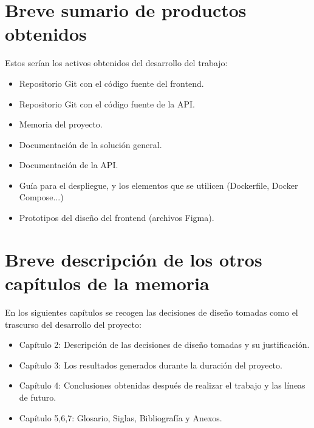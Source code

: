\section{Breve sumario de productos obtenidos}
Estos serían los activos obtenidos del desarrollo del trabajo:
\begin{itemize}
	\item Repositorio Git con el código fuente del frontend.
	\item Repositorio Git con el código fuente de la API.
	\item Memoria del proyecto.
	\item Documentación de la solución general.
	\item Documentación de la API.
	\item Guía para el despliegue, y los elementos que se utilicen (Dockerfile, Docker Compose...)
	\item Prototipos del diseño del frontend (archivos Figma).
\end{itemize}

\section{Breve descripción de los otros capítulos de la memoria}
En los siguientes capítulos se recogen las decisiones de diseño tomadas como el trascurso del desarrollo del proyecto:
\begin{itemize}
	\item Capítulo 2: Descripción de las decisiones de diseño tomadas y su justificación.
	\item Capítulo 3: Los resultados generados durante la duración del proyecto.
	\item Capítulo 4: Conclusiones obtenidas después de realizar el trabajo y las líneas de futuro.
	\item Capítulo 5,6,7:  Glosario, Siglas, Bibliografía y Anexos.
\end{itemize}
 


